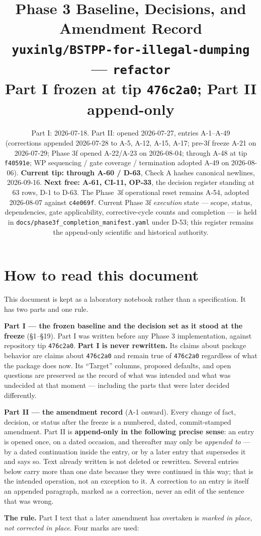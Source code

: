 \documentclass[
  10pt,
]{article}
\author{}
\date{}
\title{Phase 3 Baseline, Decisions, and Amendment Record\\[3pt]
\large \texttt{yuxinlg/\allowbreak{}BSTPP-for-illegal-dumping} --- \texttt{refactor}\\[2pt]
\large Part I frozen at tip \texttt{476c2a0}; Part II append-only}
\author{}
\date{Part I: 2026-07-18. Part II: opened 2026-07-27, entries A-1--A-49\\ (corrections appended 2026-07-28 to A-5, A-12, A-15, A-17; pre-3f freeze A-21 on 2026-07-29; Phase 3f opened A-22/A-23 on 2026-08-04; through A-48 at tip \texttt{f40591e}; WP sequencing / gate coverage / termination adopted A-49 on 2026-08-06). \textbf{Current tip: through A-60 / D-63}, Check A hashes canonical newlines, 2026-09-16. \textbf{Next free: A-61, CI-11, OP-33}, the decision register standing at 63 rows, D-1 to D-63. The Phase~3f operational reset remains A-54, adopted 2026-08-07 against \texttt{c4e069f}. Current Phase 3f \emph{execution} state --- scope, status, dependencies, gate applicability, corrective-cycle counts and completion --- is held in \texttt{docs/phase3f\_completion\_manifest.yaml} under D-53; this register remains the append-only scientific and historical authority.}
\begin{document}
\maketitle

\hypertarget{how-to-read-this-document}{%
\section*{How to read this document}\label{how-to-read-this-document}}

This document is kept as a laboratory notebook rather than a specification. It has two parts and one rule.

\textbf{Part I --- the frozen baseline and the decision set as it stood at the freeze} (§1--§19). Part I was written before any Phase 3 implementation, against repository tip \texttt{476c2a0}. \textbf{Part I is never rewritten.} Its claims about package behavior are claims about \texttt{476c2a0} and remain true of \texttt{476c2a0} regardless of what the package does now. Its ``Target'' columns, proposed defaults, and open questions are preserved as the record of what was intended and what was undecided at that moment --- including the parts that were later decided differently.

\textbf{Part II --- the amendment record} (A-1 onward). Every change of fact, decision, or status after the freeze is a numbered, dated, commit-stamped amendment. Part II is \textbf{append-only in the following precise sense}: an entry is opened once, on a dated occasion, and thereafter may only be \emph{appended to} --- by a dated continuation inside the entry, or by a later entry that supersedes it and says so. Text already written is not deleted or rewritten. Several entries below carry more than one date because they were continued in this way; that is the intended operation, not an exception to it. A correction to an entry is itself an appended paragraph, marked as a correction, never an edit of the sentence that was wrong.

\textbf{The rule.} Part I text that a later amendment has overtaken is \emph{marked in place, not corrected in place}. Four marks are used:
\end{document}
